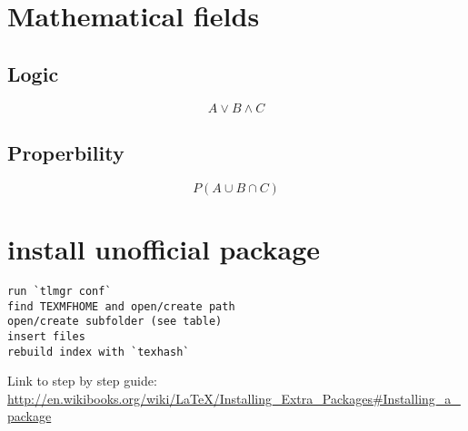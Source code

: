 \documentclass[a4paper]{article}
\begin{document}
\section{Mathematical fields}

\subsection{Logic}

\begin{equation}
A \vee B \wedge C
\end{equation}

\subsection{Properbility}

\begin{equation}
P(A \cup B \cap C)
\end{equation}

\section{install unofficial package}

\begin{lstlisting}
run `tlmgr conf`
find TEXMFHOME and open/create path
open/create subfolder (see table)
insert files
rebuild index with `texhash`
\end{lstlisting}

Link to step by step guide: \\ \url{http://en.wikibooks.org/wiki/LaTeX/Installing\_Extra\_Packages\#Installing\_a\_package}
\end{document}
